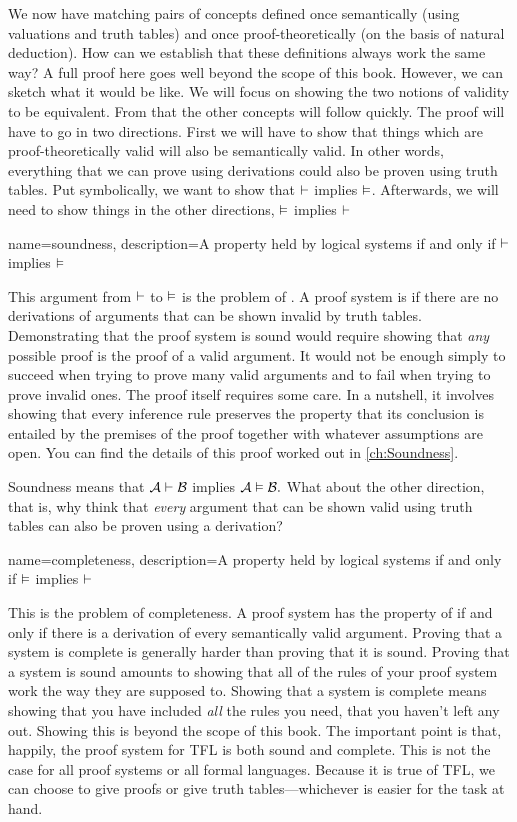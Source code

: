 We now have matching pairs of concepts defined once
semantically (using valuations and truth tables) and once
proof-theoretically (on the basis of natural deduction). How can we
establish that these definitions always work the same way? A full
proof here goes well beyond the scope of this book. However, we can
sketch what it would be like. We will focus on showing the two notions
of validity to be equivalent. From that the other concepts will follow
quickly. The proof will have to go in two directions. First we will
have to show that things which are proof-theoretically valid will also
be semantically valid. In other words, everything that we can prove
using derivations could also be proven using truth tables. Put
symbolically, we want to show that $\vdash$ implies
$\vDash$. Afterwards, we will need to show things in the
other directions, $\vDash$ implies $\vdash$

{
name=soundness,
description={A property held by logical systems if and only if $\vdash $ implies $\vDash $}
}

This argument from $\vdash $ to $\vDash $ is the problem of
.\label{def:soundness} A proof system is
 if there are no derivations of arguments that can be
shown invalid by truth tables. \label{def_Soundness} Demonstrating
that the proof system is sound would require showing that \emph{any}
possible proof is the proof of a valid argument. It would not be
enough simply to succeed when trying to prove many valid arguments and
to fail when trying to prove invalid ones. The proof itself requires
some care. In a nutshell, it involves showing that every inference
rule preserves the property that its conclusion is entailed by the
premises of the proof together with whatever assumptions are open. You
can find the details of this proof worked out in \cref{ch:Soundness}.

Soundness means that $\mathcal{A} \vdash \mathcal{B}$ implies $\mathcal{A}
\vDash \mathcal{B}.$ What about the other direction, that is, why
think that \emph{every} argument that can be shown valid using truth
tables can also be proven using a derivation? 

{
name=completeness,
description={A property held by logical systems if and only if $\vDash $ implies $\vdash $}
}

This is the problem of completeness. A proof system has the property of  \label{def:completeness} if and only if there is a derivation of every semantically valid argument. Proving that a system is complete is generally harder than proving that it is sound. Proving that a system is sound amounts to showing that all of the rules of your proof system work the way they are supposed to. Showing that a system is complete means showing that you have included \emph{all} the rules you need, that you haven't left any out. Showing this is beyond the scope of this book. The important point is that, happily, the proof system for TFL is both sound and complete. This is not the case for all proof systems or all formal languages. Because it is true of TFL, we can choose to give proofs or give truth tables---whichever is easier for the task at hand.

